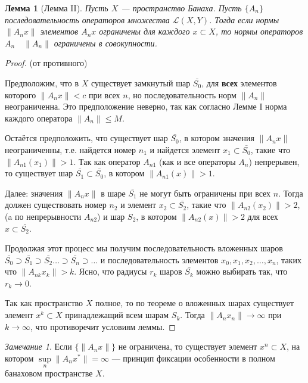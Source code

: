 \documentclass[12pt,a4paper,titlepage,oneside]{book}
\theoremstyle{definition}
\theoremstyle{plain}
\theoremstyle{remark}
\newtheorem*{remark}{Замечание}
\theoremstyle{remark}
\theoremstyle{remark}
\theoremstyle{remark}
\theoremstyle{plain}
\newtheorem*{lemma}{Лемма}
\theoremstyle{plain}
\begin{document}
\begin{lemma}[Лемма II]
Пусть $X$ --- пространство Банаха. Пусть $\lbrace A_n\rbrace$ последовательность операторов множества $\mathcal{L}(X,Y)$. Тогда если нормы $\lVert A_n x\rVert$ элементов $A_n x$ ограничены для каждого $x \subset X$, то нормы операторов $A_n \quad \lVert A_n\rVert$ ограничены в совокупности.
\end{lemma}

\begin{proof}
(от противного)

Предположим, что в $X$ существует замкнутый шар $\bar{S_0}$, для \textbf{всех} элементов которого $\lVert A_n x\rVert < c$ при всех $n$, но последовательность норм $\lVert A_n\rVert$ неограниченна. Это предположение неверно, так как согласно Лемме I норма каждого оператора $\lVert A_n\rVert \le M$.

Остаётся предположить, что существует шар $\bar{S_0}$, в котором значения $\lVert A_n x\rVert$ неограниченны, т.е. найдется номер $n_1$ и найдется элемент $x_1 \subset \bar{S_0}$, такие что $\lVert A_{n1} (x_1)\rVert > 1$. Так как оператор $A_{n1}$ (как и все операторы $A_n$) непрерывен, то существует шар $\bar{S_1} \subset \bar{S_0}$, в котором $\lVert A_{n1} (x)\rVert > 1$.

Далее: значения $\lVert A_n x\rVert$ в шаре $\bar{S_1}$ не могут быть ограничены при всех $n$. Тогда должен существовать номер $n_2$ и элемент $x_2 \subset \bar{S_2}$, такие что $\lVert A_{n2} (x_2)\rVert > 2$, (a по непрерывности $A_{n2}$) и шар $S_2$, в котором $\lVert A_{n2} (x)\rVert > 2$ для всех $x \subset \bar{S_2}$.

Продолжая этот процесс мы получим последовательность вложенных шаров $\bar{S_0} \supset \bar{S_1} \supset \bar{S_2} \ldots \supset \bar{S_n} \supset \ldots$ и последовательность элементов $x_0, x_1, x_2, \ldots, x_n$, таких что $\lVert A_{nk} x_k\rVert > k$. Ясно, что радиусы $r_k$ шаров $\bar{S_k}$ можно выбирать так, что $r_k \to 0$.

Так как пространство $X$ полное, то по теореме о вложенных шарах существует элемент $x^k \subset X$ принадлежащий всем шарам $S_k$. Тогда $\lVert A_n x_n\rVert \to \infty$ при $k \to \infty$, что противоречит условиям леммы.
\end{proof}

\begin{remark}
Если $\lbrace \lVert A_n x\rVert \rbrace$ не ограничена, то существует элемент $x^n \subset X$, на котором $\sup\limits_{n}\lVert A_n x^*\rVert = \infty$ --- принцип фиксации особенности в полном банаховом пространстве $X$.
\end{remark}
\end{document}
